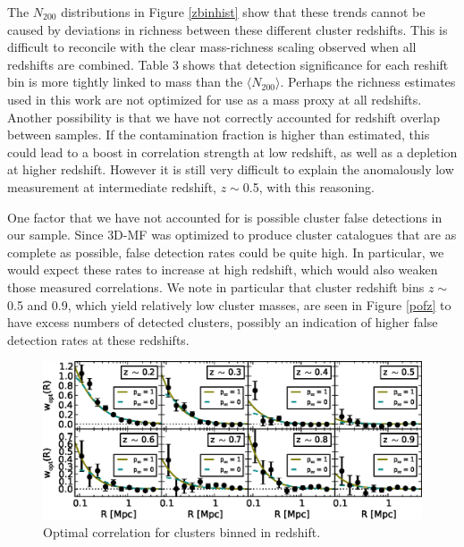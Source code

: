 The $N_{200}$ distributions in Figure \ref{zbinhist} show that these trends cannot be caused by deviations in richness between these different cluster redshifts. This is difficult to reconcile with the clear mass-richness scaling observed when all redshifts are combined. Table 3 shows that detection significance for each reshift bin is more tightly linked to mass than the $\langle N_{200} \rangle$. Perhaps the richness estimates used in this work are not optimized for use as a mass proxy at all redshifts. Another possibility is that we have not correctly accounted for redshift overlap between samples. If the contamination fraction is higher than estimated, this could lead to a boost in correlation strength at low redshift, as well as a depletion at higher redshift. However it is still very difficult to explain the anomalously low measurement at intermediate redshift, $z \sim$0.5, with this reasoning.

One factor that we have not accounted for is possible cluster false detections in our sample. Since \ac{3D-MF} was optimized to produce cluster catalogues that are as complete as possible, false detection rates could be quite high. In particular, we would expect these rates to increase at high redshift, which would also weaken those measured correlations. We note in particular that cluster redshift bins $z \sim$ 0.5 and 0.9, which yield relatively low cluster masses, are seen in Figure \ref{pofz} to have excess numbers of detected clusters, possibly an indication of higher false detection rates at these redshifts.


\begin{figure}
\begin{center}
\includegraphics[scale=0.9]{plots_ch3/wopt_z_panels_U.eps}
\caption[Magnification for Redshift-Binned Clusters]{Optimal correlation for clusters binned in redshift.}
\label{zbinw}
\end{center}
\end{figure}


